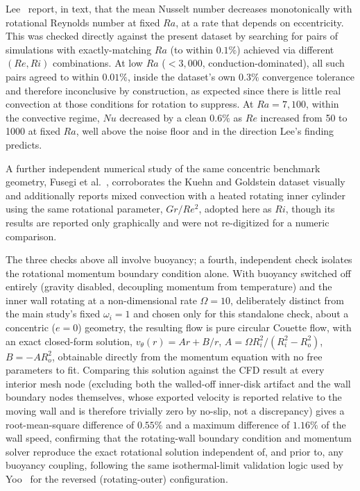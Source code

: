 Lee~\cite{Lee1992a,Lee1992b} report, in text, that the mean Nusselt number decreases monotonically with rotational Reynolds number at fixed $Ra$, at a rate that depends on eccentricity. This was checked directly against the present dataset by searching for pairs of simulations with exactly-matching $Ra$ (to within $0.1\%$) achieved via different $(Re,Ri)$ combinations. At low $Ra$ ($<3{,}000$, conduction-dominated), all such pairs agreed to within $0.01\%$, inside the dataset's own $0.3\%$ convergence tolerance and therefore inconclusive by construction, as expected since there is little real convection at those conditions for rotation to suppress. At $Ra=7{,}100$, within the convective regime, $Nu$ decreased by a clean $0.6\%$ as $Re$ increased from 50 to 1000 at fixed $Ra$, well above the noise floor and in the direction Lee's finding predicts.

A further independent numerical study of the same concentric benchmark geometry, Fusegi et al.~\cite{Fusegi1986}, corroborates the Kuehn and Goldstein dataset visually and additionally reports mixed convection with a heated rotating inner cylinder using the same rotational parameter, $Gr/Re^2$, adopted here as $Ri$, though its results are reported only graphically and were not re-digitized for a numeric comparison.

The three checks above all involve buoyancy; a fourth, independent check isolates the rotational momentum boundary condition alone. With buoyancy switched off entirely (gravity disabled, decoupling momentum from temperature) and the inner wall rotating at a non-dimensional rate $\Omega=10$, deliberately distinct from the main study's fixed $\omega_i=1$ and chosen only for this standalone check, about a concentric ($e=0$) geometry, the resulting flow is pure circular Couette flow, with an exact closed-form solution, $v_\theta(r) = Ar+B/r$, $A=\Omega R_i^2/(R_i^2-R_o^2)$, $B=-AR_o^2$, obtainable directly from the momentum equation with no free parameters to fit. Comparing this solution against the CFD result at every interior mesh node (excluding both the walled-off inner-disk artifact and the wall boundary nodes themselves, whose exported velocity is reported relative to the moving wall and is therefore trivially zero by no-slip, not a discrepancy) gives a root-mean-square difference of $0.55\%$ and a maximum difference of $1.16\%$ of the wall speed, confirming that the rotating-wall boundary condition and momentum solver reproduce the exact rotational solution independent of, and prior to, any buoyancy coupling, following the same isothermal-limit validation logic used by Yoo~\cite{Yoo1998} for the reversed (rotating-outer) configuration.

